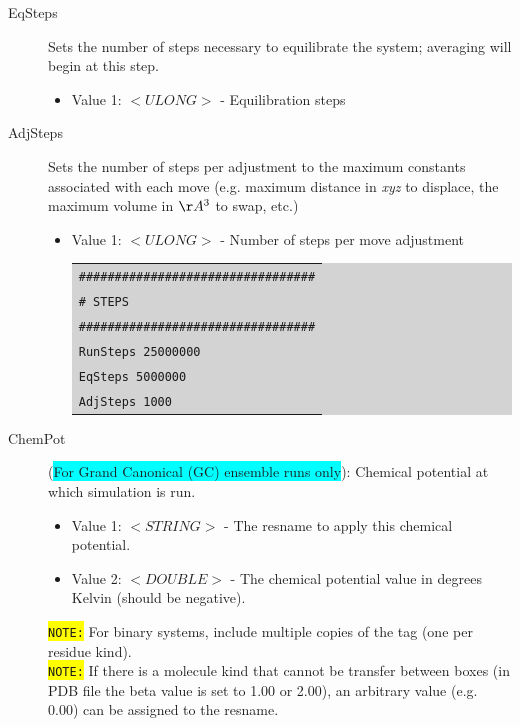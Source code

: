 \begin{description}
\begin{itemize}
	\end{itemize}
\item [EqSteps] Sets the number of steps necessary to equilibrate the system; averaging will begin at this step.
	\begin{itemize}
	\item Value 1: $<ULONG>$ - Equilibration steps
	\end{itemize}
\item [AdjSteps] Sets the number of steps per adjustment to the maximum constants associated with each move (e.g. maximum distance in \textit{xyz} to displace, the maximum volume in $\AA^3$ to swap, etc.)
	\begin{itemize}
	\item Value 1: $<ULONG>$ - Number of steps per move adjustment\\
	\colorbox{lightgray}{
	\begin{tabular}{l}
	\texttt{\#\#\#\#\#\#\#\#\#\#\#\#\#\#\#\#\#\#\#\#\#\#\#\#\#\#\#\#\#\#\#\#\#}\\
	\texttt{\# STEPS}\\
	\texttt{\#\#\#\#\#\#\#\#\#\#\#\#\#\#\#\#\#\#\#\#\#\#\#\#\#\#\#\#\#\#\#\#\#}\\
	\texttt{RunSteps           25000000}\\
	\texttt{EqSteps		   5000000}\\
	\texttt{AdjSteps	        1000}\\
	\end{tabular}}
	\end{itemize}
\item [ChemPot] (\colorbox{cyan}{For Grand Canonical (GC) ensemble runs only}): Chemical potential at which simulation is run.
	\begin{itemize}
	\item Value 1: $<STRING>$ - The resname to apply this chemical potential.
	\item Value 2: $<DOUBLE>$ - The chemical potential value in degrees Kelvin (should be negative).
	\end{itemize}
	\colorbox{yellow}{\texttt{NOTE:}} For binary systems, include multiple copies of the tag (one per residue kind).\\
	\colorbox{yellow}{\texttt{NOTE:}} If there is a molecule kind that cannot be transfer between boxes (in PDB file the beta value is set to 1.00 or 2.00), an arbitrary value (e.g. 0.00) can be assigned to the resname.\\
	\colorbox{lightgray}{
	\begin{tabular}{l}

\end{tabular}}
\end{description}
